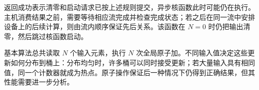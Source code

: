 返回成功表示清零和启动请求已按上述规则提交，异步核函数此时可能仍在执行。主机消费结果之前，需要等待相应流完成并检查完成状态；若之后在同一流中安排设备上的后续计算，则由流内顺序保证先后关系。该函数在 $N=0$ 时仍把输出清零，然后跳过核函数启动。

基本算法总共读取 $N$ 个输入元素，执行 $N$ 次全局原子加。不同输入值决定这些更新如何分布到桶上：分布均匀时，许多桶可以同时接受更新；若大量输入具有相同值，同一个计数器就成为热点。原子操作保证后一种情况下仍得到正确结果，但其性能需要进一步分析。
